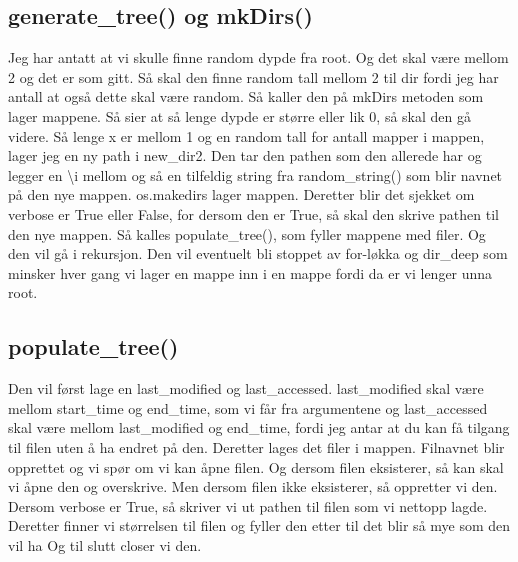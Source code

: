 \documentclass{article}
\begin{document}
\subsection{generate\_tree() og mkDirs()}
Jeg har antatt at vi skulle finne random dypde fra root. Og det skal
være mellom 2 og det er som gitt. Så skal den finne random tall mellom 2 
til dir fordi jeg har antall at også dette skal være random. Så kaller den
på mkDirs metoden som lager mappene.
Så sier at så lenge dypde er større eller lik 0, så skal den gå videre.
Så lenge x er mellom 1 og en random tall for antall mapper i mappen,
lager jeg en ny path i new\_dir2. Den tar den pathen som den allerede har og
legger en \textbackslash i mellom og så en tilfeldig string fra random\_string() som 
blir navnet på den nye mappen. os.makedirs lager mappen. Deretter blir 
det sjekket om verbose er True eller False, for dersom den er True, så skal 
den skrive pathen til den nye mappen. Så kalles populate\_tree(), som fyller 
mappene med filer. Og den vil gå i rekursjon. Den vil eventuelt bli stoppet
av for-løkka og dir\_deep som minsker hver gang vi lager en mappe inn i en
mappe fordi da er vi lenger unna root.

\subsection{populate\_tree()}
Den vil først lage en last\_modified og last\_accessed. last\_modified skal
være mellom start\_time og end\_time, som vi får fra argumentene og 
last\_accessed skal være mellom last\_modified og end\_time, fordi jeg
antar at du kan få tilgang til filen uten å ha endret på den. 
Deretter lages det filer i mappen. Filnavnet blir opprettet og vi spør 
om vi kan åpne filen. Og dersom filen eksisterer, så kan skal vi åpne
den og overskrive. Men dersom filen ikke eksisterer, så oppretter vi den. 
Dersom verbose er True, så skriver vi ut pathen til filen som vi nettopp
lagde. Deretter finner vi størrelsen til filen og fyller den etter til
det blir så mye som den vil ha Og til slutt closer vi den.
\end{document}
